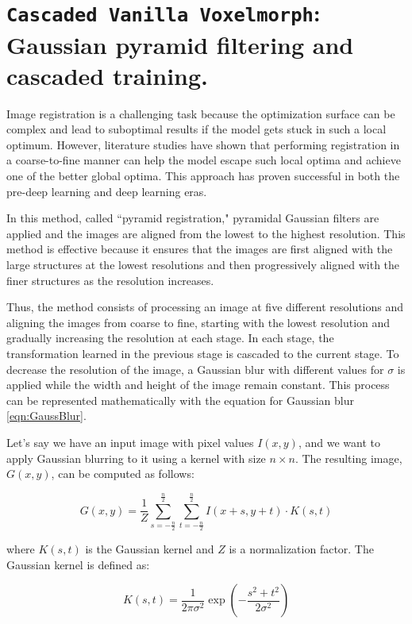 \documentclass{book}
\begin{document}
	\section{\texttt{Cascaded Vanilla Voxelmorph}: Gaussian pyramid filtering and cascaded training.}
	Image registration is a challenging task because the optimization surface can be complex and lead to suboptimal results if the model gets stuck in such a local optimum. However, literature studies have shown that performing registration in a coarse-to-fine manner can help the model escape such local optima and achieve one of the better global optima. This approach has proven successful in both the pre-deep learning and deep learning eras.
	
	In this method, called ``pyramid registration," pyramidal Gaussian filters are applied and the images are aligned from the lowest to the highest resolution. This method is effective because it ensures that the images are first aligned with the large structures at the lowest resolutions and then progressively aligned with the finer structures as the resolution increases.
	
	Thus, the method consists of processing an image at five different resolutions and aligning the images from coarse to fine, starting with the lowest resolution and gradually increasing the resolution at each stage. In each stage, the transformation learned in the previous stage is cascaded to the current stage. To decrease the resolution of the image, a Gaussian blur with different values for $\sigma$ is applied while the width and height of the image remain constant. This process can be represented mathematically with the equation for Gaussian blur \ref{eqn:GaussBlur}.
	
	Let's say we have an input image with pixel values $I(x, y)$, and we want to apply Gaussian blurring to it using a kernel with size $n \times n$. The resulting image, $G(x, y)$, can be computed as follows:
	
	\begin{equation}\label{eqn:GaussBlur}
		G(x, y) = \frac{1}{Z} \sum_{s=-\frac{n}{2}}^{\frac{n}{2}}\sum_{t=-\frac{n}{2}}^{\frac{n}{2}}I(x+s, y+t) \cdot K(s, t)
	\end{equation}
	
	where $K(s, t)$ is the Gaussian kernel and $Z$ is a normalization factor. The Gaussian kernel is defined as:
	
	\begin{equation}
		K(s, t) = \frac{1}{2\pi \sigma^2} \exp\left(-\frac{s^2+t^2}{2\sigma^2}\right)
	\end{equation}
	
\end{document}
